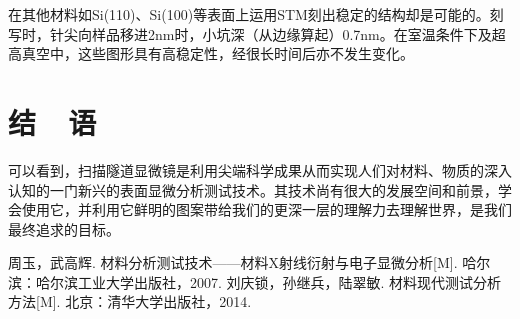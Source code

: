 \documentclass[a4paper, zihao=-4, linespread=1.25]{ctexrep}
\begin{document}
在其他材料如Si(110)、Si(100)等表面上运用STM刻出稳定的结构却是可能的。刻写时，针尖向样品移进2nm时，小坑深（从边缘算起）0.7nm。在室温条件下及超高真空中，这些图形具有高稳定性，经很长时间后亦不发生变化。


\chapter{结~~语}
可以看到，扫描隧道显微镜是利用尖端科学成果从而实现人们对材料、物质的深入认知的一门新兴的表面显微分析测试技术。其技术尚有很大的发展空间和前景，学会使用它，并利用它鲜明的图案带给我们的更深一层的理解力去理解世界，是我们最终追求的目标。

\begin{thebibliography}{99}
	\addtolength{\itemsep}{-2ex} %
	周玉，武高辉. 材料分析测试技术——材料X射线衍射与电子显微分析[M]. 哈尔滨：哈尔滨工业大学出版社，2007.
	刘庆锁，孙继兵，陆翠敏. 材料现代测试分析方法[M]. 北京：清华大学出版社，2014.
\end{thebibliography} 
\end{document}
